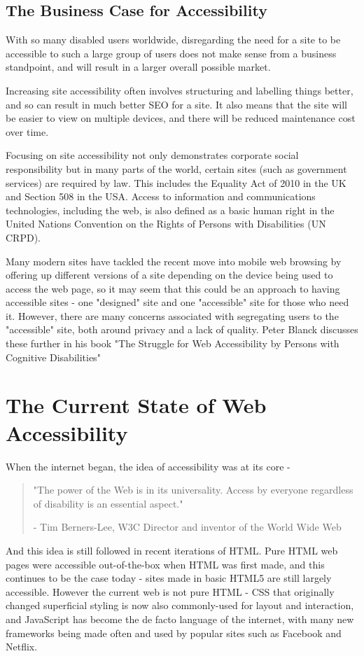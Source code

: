 \documentclass[ %
                    author={Aleena Baig},
                supervisor={Dr Simon Lock},
                    degree={BSc},
                     title={On Making Web Accessible Graphs},
                  subtitle={},
                      year={2019} ]{dissertation}
\begin{document}
\subsection{The Business Case for Accessibility}

With so many disabled users worldwide, disregarding the need for a site to be accessible to such a large group of users does not make sense from a business standpoint, and will result in a larger overall possible market.

Increasing site accessibility often involves structuring and labelling things better, and so can result in much better SEO for a site. It also means that the site will be easier to view on multiple devices, and there will be reduced maintenance cost over time.\cite{WAIaccessibilityintro}

Focusing on site accessibility not only demonstrates corporate social responsibility but in many parts of the world, certain sites (such as government services) are required by law. This includes the Equality Act of 2010 in the UK and Section 508 in the USA. Access to information and communications technologies, including the web, is also defined as a basic human right in the United Nations Convention on the Rights of Persons with Disabilities (UN CRPD). \cite{accessibilityUN}

Many modern sites have tackled the recent move into mobile web browsing by offering up different versions of a site depending on the device being used to access the web page, so it may seem that this could be an approach to having accessible sites - one "designed" site and one "accessible" site for those who need it. However, there are many concerns associated with segregating users to the "accessible" site, both around privacy and a lack of quality. Peter Blanck discusses these further in his book "The Struggle for Web Accessibility by Persons with Cognitive Disabilities" \cite[p.~157]{strugglewebaccessibility}

\section{The Current State of Web Accessibility}

When the internet began, the idea of accessibility was at its core -

\begin{quote}
\centering
"The power of the Web is in its universality. Access by everyone regardless of disability is an essential aspect."

- Tim Berners-Lee, W3C Director and inventor of the World Wide Web
\end{quote}
%
And this idea is still followed in recent iterations of HTML. Pure HTML web pages were accessible out-of-the-box when HTML was first made, and this continues to be the case today - sites made in basic HTML5 are still largely accessible. However the current web is not pure HTML - CSS that originally changed superficial styling is now also commonly-used for layout and interaction, and JavaScript has become the de facto language of the internet, with many new frameworks being made often and used by popular sites such as Facebook and Netflix.
\end{document}
